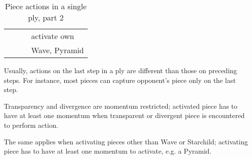 \begin{table}[!h]
\begin{tabular}{ llll }
                            &                           &                               & activate own              \\
                            &                           &                               & Wave, Pyramid             \\
\bottomrule %
\end{tabular}
\caption{Piece actions in a single ply, part 2}
\label{tbl:Appendix/Summary/Piece actions, part 2}
\end{table}


Usually, actions on the last step in a ply are different than those on preceding
steps. For instance, most pieces can capture opponent's piece only on the last step.

Transparency and divergence are momentum restricted; activated piece has to have at
least one momentum when transparent or divergent piece is encountered to perform
action.

The same applies when activating pieces other than Wave or Starchild; activating
piece has to have at least one momentum to activate, e.g. a Pyramid.

\clearpage %

